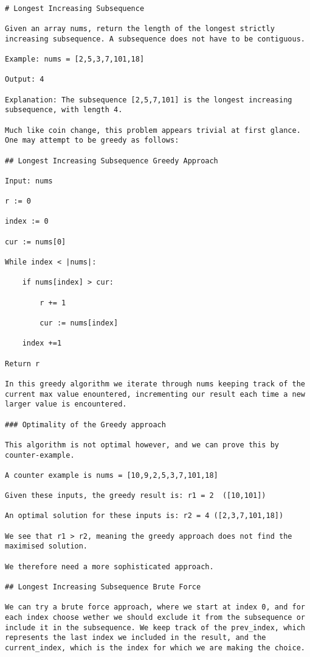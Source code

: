 \begin{verbatim}

# Longest Increasing Subsequence

Given an array nums, return the length of the longest strictly increasing subsequence. A subsequence does not have to be contiguous.

Example: nums = [2,5,3,7,101,18]

Output: 4

Explanation: The subsequence [2,5,7,101] is the longest increasing subsequence, with length 4.

Much like coin change, this problem appears trivial at first glance. One may attempt to be greedy as follows:

## Longest Increasing Subsequence Greedy Approach

Input: nums

r := 0

index := 0

cur := nums[0]

While index < |nums|:

    if nums[index] > cur:

        r += 1

        cur := nums[index]

    index +=1

Return r

In this greedy algorithm we iterate through nums keeping track of the current max value enountered, incrementing our result each time a new larger value is encountered.

### Optimality of the Greedy approach

This algorithm is not optimal however, and we can prove this by counter-example.

A counter example is nums = [10,9,2,5,3,7,101,18]

Given these inputs, the greedy result is: r1 = 2  ([10,101])

An optimal solution for these inputs is: r2 = 4 ([2,3,7,101,18])

We see that r1 > r2, meaning the greedy approach does not find the maximised solution.

We therefore need a more sophisticated approach.

## Longest Increasing Subsequence Brute Force

We can try a brute force approach, where we start at index 0, and for each index choose wether we should exclude it from the subsequence or include it in the subsequence. We keep track of the prev_index, which represents the last index we included in the result, and the current_index, which is the index for which we are making the choice.


\end{verbatim}
